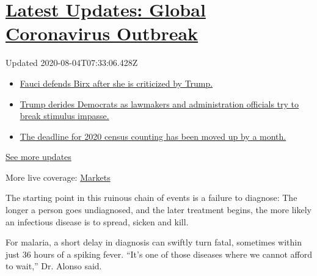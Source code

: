 \hypertarget{latest-updates-global-coronavirus-outbreak}{%
\section{\texorpdfstring{\href{https://www.nytimes3xbfgragh.onion/2020/08/03/world/coronavirus-covid-19.html?action=click\&pgtype=Article\&state=default\&region=MAIN_CONTENT_1\&context=storylines_live_updates}{Latest
Updates: Global Coronavirus
Outbreak}}{Latest Updates: Global Coronavirus Outbreak}}\label{latest-updates-global-coronavirus-outbreak}}

Updated 2020-08-04T07:33:06.428Z

\begin{itemize}
\tightlist
\item
  \href{https://www.nytimes3xbfgragh.onion/2020/08/03/world/coronavirus-covid-19.html?action=click\&pgtype=Article\&state=default\&region=MAIN_CONTENT_1\&context=storylines_live_updates\#link-4547638f}{Fauci
  defends Birx after she is criticized by Trump.}
\item
  \href{https://www.nytimes3xbfgragh.onion/2020/08/03/world/coronavirus-covid-19.html?action=click\&pgtype=Article\&state=default\&region=MAIN_CONTENT_1\&context=storylines_live_updates\#link-15e7f995}{Trump
  derides Democrats as lawmakers and administration officials try to
  break stimulus impasse.}
\item
  \href{https://www.nytimes3xbfgragh.onion/2020/08/03/world/coronavirus-covid-19.html?action=click\&pgtype=Article\&state=default\&region=MAIN_CONTENT_1\&context=storylines_live_updates\#link-e5a2cda}{The
  deadline for 2020 census counting has been moved up by a month.}
\end{itemize}

\href{https://www.nytimes3xbfgragh.onion/2020/08/03/world/coronavirus-covid-19.html?action=click\&pgtype=Article\&state=default\&region=MAIN_CONTENT_1\&context=storylines_live_updates}{See
more updates}

More live coverage:
\href{https://www.nytimes3xbfgragh.onion/live/2020/08/03/business/stock-market-today-coronavirus?action=click\&pgtype=Article\&state=default\&region=MAIN_CONTENT_1\&context=storylines_live_updates}{Markets}

The starting point in this ruinous chain of events is a failure to
diagnose: The longer a person goes undiagnosed, and the later treatment
begins, the more likely an infectious disease is to spread, sicken and
kill.

For malaria, a short delay in diagnosis can swiftly turn fatal,
sometimes within just 36 hours of a spiking fever. ``It's one of those
diseases where we cannot afford to wait,'' Dr. Alonso said.

